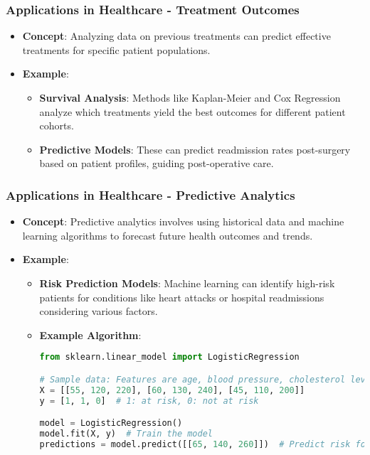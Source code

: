 \documentclass[aspectratio=169]{beamer}
\begin{document}
\begin{frame}[fragile]
    \frametitle{Applications in Healthcare - Treatment Outcomes}
    \begin{itemize}
        \item \textbf{Concept}: Analyzing data on previous treatments can predict effective treatments for specific patient populations.
        \item \textbf{Example}:
        \begin{itemize}
            \item \textbf{Survival Analysis}: Methods like Kaplan-Meier and Cox Regression analyze which treatments yield the best outcomes for different patient cohorts.
            \item \textbf{Predictive Models}: These can predict readmission rates post-surgery based on patient profiles, guiding post-operative care.
        \end{itemize}
    \end{itemize}
\end{frame}

\begin{frame}[fragile]
    \frametitle{Applications in Healthcare - Predictive Analytics}
    \begin{itemize}
        \item \textbf{Concept}: Predictive analytics involves using historical data and machine learning algorithms to forecast future health outcomes and trends.
        \item \textbf{Example}: 
        \begin{itemize}
            \item \textbf{Risk Prediction Models}: Machine learning can identify high-risk patients for conditions like heart attacks or hospital readmissions considering various factors.
            \item \textbf{Example Algorithm}:
            \begin{lstlisting}[language=Python]
from sklearn.linear_model import LogisticRegression

# Sample data: Features are age, blood pressure, cholesterol levels
X = [[55, 120, 220], [60, 130, 240], [45, 110, 200]]
y = [1, 1, 0]  # 1: at risk, 0: not at risk

model = LogisticRegression()
model.fit(X, y)  # Train the model
predictions = model.predict([[65, 140, 260]])  # Predict risk for a new patient
            \end{lstlisting}
        \end{itemize}
    \end{itemize}
\end{frame}
\end{document}
